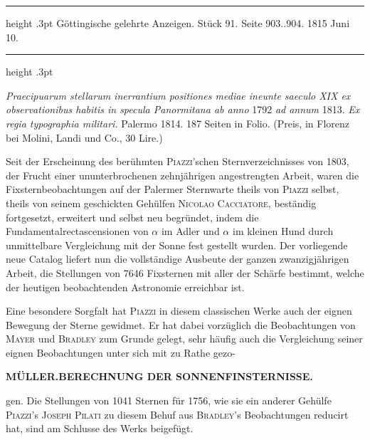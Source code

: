 \par\bigskip
\hypertarget{native-595-lower}{}
\begin{center}
\parbox{.80\linewidth}{%
\centering\small
\hrule height .3pt\relax\vspace{2.5pt}
Göttingische gelehrte Anzeigen. Stück 91. Seite 903..904. 1815 Juni 10.\par
\vspace{2.5pt}\hrule height .3pt\relax
}
\end{center}

\emph{Praecipuarum stellarum inerrantium positiones mediae ineunte saeculo XIX ex observationibus habitis in specula Panormitana ab anno} 1792 \emph{ad annum} 1813. \emph{Ex regia typographia militari.} Palermo 1814. 187 Seiten in Folio. (Preis, in Florenz bei Molini, Landi und Co., 30 Lire.)

Seit der Erscheinung des berühmten \textsc{Piazzi}'schen Sternverzeichnisses von 1803, der Frucht einer ununterbrochenen zehnjährigen angestrengten Arbeit, waren die Fixsternbeobachtungen auf der Palermer Sternwarte theils von \textsc{Piazzi} selbst, theils von seinem geschickten Gehülfen \textsc{Nicolao Cacciatore}, beständig fortgesetzt, erweitert und selbst neu begründet, indem die Fundamentalrectascensionen von $\alpha$ im Adler und $\alpha$ im kleinen Hund durch unmittelbare Vergleichung mit der Sonne fest gestellt wurden. Der vorliegende neue Catalog liefert nun die vollständige Ausbeute der ganzen zwanzigjährigen Arbeit, die Stellungen von 7646 Fixsternen mit aller der Schärfe bestimmt, welche der heutigen beobachtenden Astronomie erreichbar ist.

Eine besondere Sorgfalt hat \textsc{Piazzi} in diesem classischen Werke auch der eignen Bewegung der Sterne gewidmet. Er hat dabei vorzüglich die Beobachtungen von \textsc{Mayer} und \textsc{Bradley} zum Grunde gelegt, sehr häufig auch die Vergleichung seiner eignen Beobachtungen unter sich mit zu Rathe gezo-\par
\clearpage
\thispagestyle{empty}
\noindent{}%
\makebox[12mm][l]{}%
\parbox[t]{\dimexpr\linewidth-24mm\relax}{\centering\footnotesize\bfseries MÜLLER.\enspace BERECHNUNG DER SONNENFINSTERNISSE.\par}%
\par\medskip
\noindent gen. Die Stellungen von 1041 Sternen für 1756, wie sie ein anderer Gehülfe \textsc{Piazzi}'s \textsc{Joseph Pilati} zu diesem Behuf aus \textsc{Bradley}'s Beobachtungen reducirt hat, sind am Schlusse des Werks beigefügt.

